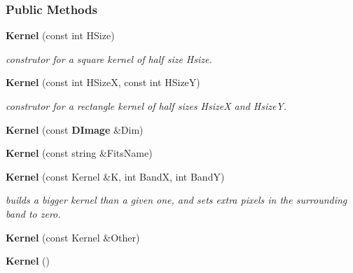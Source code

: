 \subsubsection*{Public Methods}
\begin{CompactItemize}
\item 
{}
{\bf Kernel} (const int HSize)\label{class_kernel_a0}

\begin{CompactList}\small\item\em construtor for a square kernel of half size Hsize.\item\end{CompactList}\item 
{}
{\bf Kernel} (const int HSize\-X, const int HSize\-Y)\label{class_kernel_a1}

\begin{CompactList}\small\item\em construtor for a rectangle kernel of half sizes Hsize\-X and Hsize\-Y.\item\end{CompactList}\item 
{}
{\bf Kernel} (const {\bf DImage} \&Dim)\label{class_kernel_a2}

\item 
{}
{\bf Kernel} (const string \&Fits\-Name)\label{class_kernel_a3}

\item 
{}
{\bf Kernel} (const Kernel \&K, int Band\-X, int Band\-Y)\label{class_kernel_a4}

\begin{CompactList}\small\item\em builds a bigger kernel than a given one, and sets extra pixels in the surrounding band to zero.\item\end{CompactList}\item 
{}
{\bf Kernel} (const Kernel \&Other)\label{class_kernel_a5}

\item 
{}
{\bf Kernel} ()\label{class_kernel_a6}


\end{CompactItemize}
